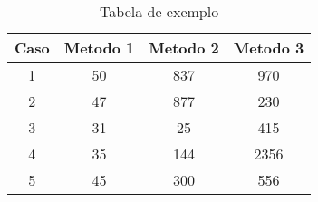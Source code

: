\documentclass{article}
\begin{document}
  \begin{table}[ht]
  \caption{Tabela de exemplo} %
  \centering  %
  \begin{tabular}{c c c c} %
  \hline\hline                        %
  Caso & Metodo 1 & Metodo 2 & Metodo 3 \\ [0.5ex] %
  \hline                  %
  1 & 50 & 837 & 970  \\ %
  2 & 47 & 877 & 230  \\
  3 & 31 & 25  & 415  \\
  4 & 35 & 144 & 2356 \\
  5 & 45 & 300 & 556 \\ [1ex]      %
  \hline %
  \end{tabular}
  \label{table:nonlin} %
  \end{table}
  
\end{document}
